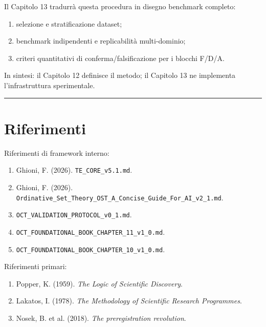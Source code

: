 Il Capitolo 13 tradurrà questa procedura in disegno benchmark completo:

\begin{enumerate}
\def\labelenumi{\arabic{enumi}.}
\tightlist
\item
  selezione e stratificazione dataset;
\item
  benchmark indipendenti e replicabilità multi-dominio;
\item
  criteri quantitativi di conferma/falsificazione per i blocchi F/D/A.
\end{enumerate}

In sintesi: il Capitolo 12 definisce il metodo; il Capitolo 13 ne implementa l'infrastruttura sperimentale.

\begin{center}\rule{0.5\linewidth}{0.5pt}\end{center}

\section{Riferimenti}

Riferimenti di framework interno:

\begin{enumerate}
\def\labelenumi{\arabic{enumi}.}
\tightlist
\item
  Ghioni, F. (2026). \texttt{TE\_CORE\_v5.1.md}.
\item
  Ghioni, F. (2026). \texttt{Ordinative\_Set\_Theory\_OST\_A\_Concise\_Guide\_For\_AI\_v2\_1.md}.
\item
  \texttt{OCT\_VALIDATION\_PROTOCOL\_v0\_1.md}.
\item
  \texttt{OCT\_FOUNDATIONAL\_BOOK\_CHAPTER\_11\_v1\_0.md}.
\item
  \texttt{OCT\_FOUNDATIONAL\_BOOK\_CHAPTER\_10\_v1\_0.md}.
\end{enumerate}

Riferimenti primari:

\begin{enumerate}
\def\labelenumi{\arabic{enumi}.}
\tightlist
\item
  Popper, K. (1959). \emph{The Logic of Scientific Discovery}.
\item
  Lakatos, I. (1978). \emph{The Methodology of Scientific Research Programmes}.
\item
  Nosek, B. et al. (2018). \emph{The preregistration revolution}.
\end{enumerate}

